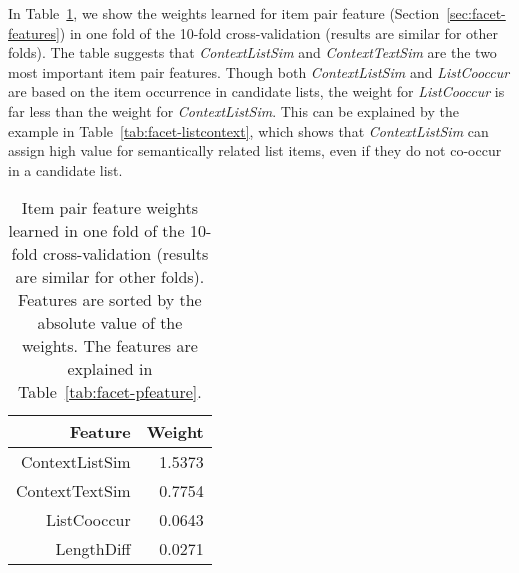 In Table~\ref{tab:intrinsic-panalysis}, we show the weights learned for item pair feature (Section~\ref{sec:facet-features}) in one fold of the 10-fold cross-validation (results are similar for other folds). The table suggests that \textit{ContextListSim} and \textit{ContextTextSim} are the two most important item pair features. Though both \textit{ContextListSim} and \textit{ListCooccur} are based on the item occurrence in candidate lists, the weight for \textit{ListCooccur} is far less than the weight for \textit{ContextListSim}. This can be explained by the example in Table~\ref{tab:facet-listcontext}, which shows that \textit{ContextListSim} can assign high value for semantically related list items, even if they do not co-occur in a candidate list.
\begin{table}[!htbp]
\centering
\caption{Item pair feature weights learned in one fold of the 10-fold cross-validation (results are similar for other folds). Features are sorted by the absolute value of the weights. The features are explained in Table~\ref{tab:facet-pfeature}.}
\label{tab:intrinsic-panalysis}
\begin{tabular}{|r|r|} \hline
Feature & Weight \\ \hline
ContextListSim & 1.5373 \\ \hline
ContextTextSim & 0.7754 \\ \hline
ListCooccur & 0.0643 \\ \hline
LengthDiff & 0.0271 \\ \hline
\end{tabular}
\end{table}

